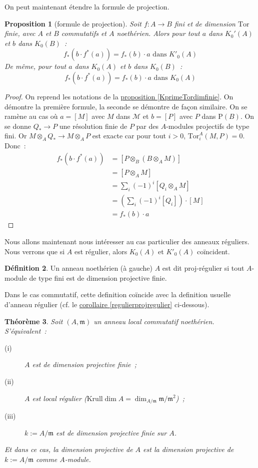 \documentclass{amsart}
\newcommand{\sref}[2]{\hyperref[#2]{#1 \ref*{#2}}}
\theoremstyle{plain}
\newtheorem{theo}{Théorème}[section]
\newtheorem{prop}[theo]{Proposition}
\theoremstyle{definition}
\newtheorem{defi}[theo]{Définition}
\theoremstyle{remark}
\newcommand{\Proj}[1]{\mathrm{P}({#1})}
\newcommand{\Tor}{\mathrm{Tor}}
\newcommand{\fTor}[4]{\mathrm{Tor}_{#1}^{#2}({#3},{#4})}
\newcommand{\ra}{\rightarrow}
\begin{document}
On peut maintenant étendre la formule de projection.

\begin{prop}[formule de projection]
  Soit $f:A\ra B$ fini et de dimension $\Tor$ finie, avec $A$ et $B$ commutatifs et $A$ noethérien.
  Alors pour tout $a$ dans $K_0'(A)$ et $b$ dans $K_0(B)$~:
  $$f_*(b\cdot f^*(a))=f_*(b)\cdot a\text{ dans }K'_0(A)$$
  De même, pour tout $a$ dans $K_0(A)$ et $b$ dans $K_0(B)$~:
  $$f_*(b\cdot f^*(a))=f_*(b)\cdot a\text{ dans }K_0(A)$$
\end{prop}

\begin{proof}
  On reprend les notations de la \sref{proposition}{KprimeTordimfinie}. On démontre la première formule, la seconde se démontre de façon similaire.
  On se ramène au cas où $a=[M]$ avec $M$ dans $\mathcal{M}$ et $b=[P]$ avec $P$ dans $\Proj{B}$. On se donne $Q_*\ra P$ une résolution
  finie de $P$ par des $A$-modules projectifs de type fini. Or $M\otimes_A Q_*\ra M\otimes_A P$ est exacte
  car pour tout $i>0$, $\fTor{i}{A}{M}{P} = 0$. Donc~:
  \begin{align*}
    f_*(b\cdot f^*(a)) &= [P\otimes_B (B\otimes_A M)] \\
                       &= [P\otimes_A M] \\
                       &= \sum_i(-1)^i[Q_i\otimes_A M] \\
                       &= (\sum_i(-1)^i[Q_i])\cdot [M] \\
                       &= f_*(b)\cdot a
  \end{align*}
\end{proof}


Nous allons maintenant nous intéresser au cas particulier des anneaux réguliers. Nous verrons que si $A$ est régulier, alors $K_0(A)$ et $K'_0(A)$ coïncident.

\begin{defi}
  Un anneau noethérien (à gauche) $A$ est dit proj-régulier si tout $A$-module de type fini est de dimension projective finie.
\end{defi}

Dans le cas commutatif, cette definition coïncide avec la definition usuelle d'anneau régulier (cf. le \sref{corollaire}{regulierprojregulier} ci-dessous).

\begin{theo}\label{thmanneauxreguliers}
  Soit $(A,\mathfrak{m})$ un anneau local commutatif noethérien. S'équivalent~:
  \begin{description}
    \item[(i)] $A$ est de dimension projective finie~;
    \item[(ii)] $A$ est local régulier ($\mathrm{Krull}\dim A = \dim_{A/\mathfrak{m}} \mathfrak{m}/\mathfrak{m}^2$)~;
    \item[(iii)] $k:=A/\mathfrak{m}$ est de dimension projective finie sur $A$.
  \end{description} 
  Et dans ce cas, la dimension projective de $A$ est la dimension projective de $k:=A/\mathfrak{m}$ comme $A$-module.
\end{theo}
\end{document}
